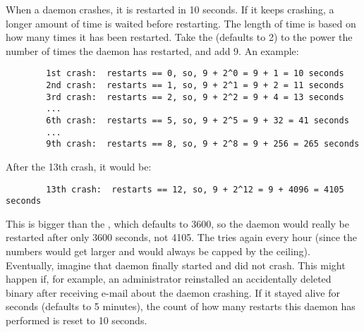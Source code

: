 When a daemon crashes, it is restarted in 10 seconds.  If it keeps
crashing, a longer amount of time is waited before restarting.
The length of time is based on how
many times it has been restarted.  
Take the  (defaults to 2) to 
the power the number of times the daemon has restarted, and add 9.
An example:
\begin{verbatim}
        1st crash:  restarts == 0, so, 9 + 2^0 = 9 + 1 = 10 seconds
        2nd crash:  restarts == 1, so, 9 + 2^1 = 9 + 2 = 11 seconds
        3rd crash:  restarts == 2, so, 9 + 2^2 = 9 + 4 = 13 seconds
        ...
        6th crash:  restarts == 5, so, 9 + 2^5 = 9 + 32 = 41 seconds
        ...
        9th crash:  restarts == 8, so, 9 + 2^8 = 9 + 256 = 265 seconds
\end{verbatim}

After the 13th crash, it would be:
\begin{verbatim}
        13th crash:  restarts == 12, so, 9 + 2^12 = 9 + 4096 = 4105 seconds
\end{verbatim}

This is bigger than the , which
defaults to 3600, so the daemon would really be restarted after only
3600 seconds, not 4105.
The  tries again every hour (since the numbers would
get larger and would always be capped by the ceiling).
Eventually, imagine that daemon finally started and did not crash.
This might happen if, for example, an administrator reinstalled
an accidentally deleted binary after receiving e-mail about
the daemon crashing.
If it stayed alive for
 seconds (defaults to 5 minutes),
the count of how many restarts this daemon has performed is reset to
10 seconds.

